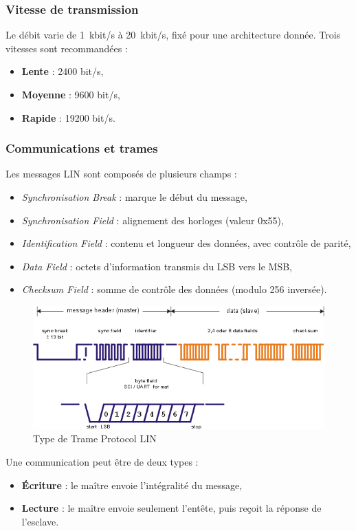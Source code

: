 \subsubsection*{Vitesse de transmission}  
Le débit varie de \SI{1}{kbit/s} à \SI{20}{kbit/s}, fixé pour une architecture donnée. Trois vitesses sont recommandées :  
\begin{itemize}
    \item \textbf{Lente} : 2400 bit/s,  
    \item \textbf{Moyenne} : 9600 bit/s,  
    \item \textbf{Rapide} : 19200 bit/s.  
\end{itemize}

\subsubsection*{Communications et trames}  
Les messages LIN sont composés de plusieurs champs :  
\begin{itemize}
    \item \textit{Synchronisation Break} : marque le début du message,  
    \item \textit{Synchronisation Field} : alignement des horloges (valeur 0x55),  
    \item \textit{Identification Field} : contenu et longueur des données, avec contrôle de parité,  
    \item \textit{Data Field} : octets d'information transmis du LSB vers le MSB,  
    \item \textit{Checksum Field} : somme de contrôle des données (modulo 256 inversée).  
\end{itemize}

\begin{figure}[H]
    \centering
    \includegraphics[width=0.8\linewidth]{images//Intro/Trame_LIN.png}
    \caption{Type de Trame Protocol LIN}
    \label{fig:placeholder}
\end{figure}

Une communication peut être de deux types :  
\begin{itemize}
    \item \textbf{Écriture} : le maître envoie l'intégralité du message,  
    \item \textbf{Lecture} : le maître envoie seulement l'entête, puis reçoit la réponse de l'esclave.  
\end{itemize}


